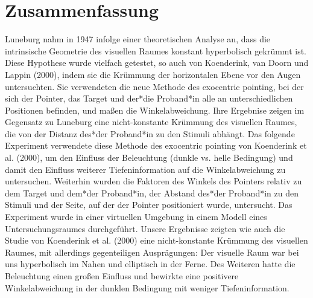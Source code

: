 \documentclass[twoside,12pt,a4paper]{report}
\begin{document}
\setcounter{page}{1}

\section*{Zusammenfassung}
Luneburg nahm in 1947 infolge einer theoretischen Analyse an, dass die intrinsische Geometrie des visuellen Raumes konstant hyperbolisch gekrümmt ist. Diese Hypothese wurde vielfach getestet, so auch von Koenderink, van Doorn und Lappin (2000), indem sie die Krümmung der horizontalen Ebene vor den Augen untersuchten. Sie verwendeten die neue Methode des exocentric pointing,
bei der sich der Pointer, das Target und der*die Proband*in alle an unterschiedlichen Positionen befinden, und maßen die Win\-kel\-ab\-wei\-chung. Ihre Ergebnise zeigen im Gegensatz zu Luneburg eine nicht-konstante Krümmung des visuellen Raumes, die von der Distanz des*der Proband*in zu den Stimuli abhängt. Das folgende Experiment verwendete diese Methode des exocentric pointing von Koenderink et al. (2000), um den Einfluss der Beleuchtung (dunk\-le vs. helle Bedingung) und damit den Einfluss weiterer Tiefeninformation auf die Winkelabweichung zu untersuchen. Weiterhin wurden die Faktoren des Winkels des Pointers relativ zu dem Target und dem*der Proband*in, der Abstand des*der Proband*in zu den Stimuli und der Seite, auf der der Pointer positioniert wurde, untersucht. Das Experiment wurde in einer virtuellen Umgebung in einem Modell eines Untersuchungsraumes durchgeführt. Unsere Ergebnisse zeigten wie auch die Studie von Koenderink et al. (2000) eine nicht-konstante Krümmung des visuellen Raumes, mit al\-ler\-dings gegenteiligen Ausprägungen: Der visuelle Raum war bei uns hyperbolisch im Nahen und elliptisch in der Ferne. Des Weiteren hatte die Beleuchtung einen großen Einfluss und bewirkte eine positivere Winkelabweichung in der dunklen Bedingung mit weniger Tiefeninformation. 

\newpage
\end{document}
